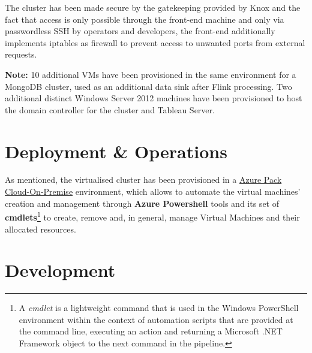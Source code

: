 The cluster has been made secure by the gatekeeping provided by Knox and the fact that access is only possible through the front-end machine and only via passwordless SSH by operators and developers, the front-end additionally implements iptables as firewall to prevent access to unwanted ports from external requests.

\textbf{Note:} 10 additional VMs have been provisioned in the same environment for a MongoDB cluster, used as an additional data sink after Flink processing. Two additional distinct Windows Server 2012 machines have been provisioned to host the domain controller for the cluster and Tableau Server.

\section{Deployment \& Operations}

As mentioned, the virtualised cluster has been provisioned in a \href{https://www.microsoft.com/it-it/cloud-platform/windows-azure-pack}{Azure Pack Cloud-On-Premise} environment, which allows to automate the virtual machines' creation and management through \textbf{Azure Powershell} tools and its set of \textbf{cmdlets}\footnote{A \textit{cmdlet} is a lightweight command that is used in the Windows PowerShell environment within the context of automation scripts that are provided at the command line, executing an action and returning a Microsoft .NET Framework object to the next command in the pipeline.} to create, remove and, in general, manage Virtual Machines and their allocated resources.







\section{Development}









